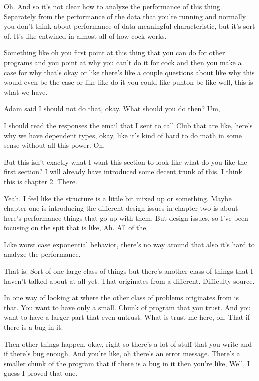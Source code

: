 \begin{subappendices}
    Oh. And so it's not clear how to analyze the performance of this thing. Separately from the performance of the data that you're running and normally you don't think about performance of data meaningful characteristic, but it's sort of. It's like entwined in almost all of how cock works. 
    
    Something like oh you first point at this thing that you can do for other programs and you point at why you can't do it for cock and then you make a case for why that's okay or like there's like a couple questions about like why this would even be the case or like like do it you could like punton be like well, this is what we have. 
    
    Adam said I should not do that, okay. What should you do then? Um, 
    
    I should read the responses the email that I sent to call Club that are like, here's why we have dependent types, okay, like it's kind of hard to do math in some sense without all this power. Oh. 
    
    But this isn't exactly what I want this section to look like what do you like the first section? I will already have introduced some decent trunk of this. I think this is chapter 2. There. 
    
    Yeah. I feel like the structure is a little bit mixed up or something. Maybe chapter one is introducing the different design issues in chapter two is about here's performance things that go up with them. But design issues, so I've been focusing on the spit that is like, Ah. All of the. 
    
    Like worst case exponential behavior, there's no way around that also it's hard to analyze the performance. 
    
    That is. Sort of one large class of things but there's another class of things that I haven't talked about at all yet. That originates from a different. Difficulty source. 
    
    In one way of looking at where the other class of problems originates from is that. You want to have only a small. Chunk of program that you trust. And you want to have a larger part that even untrust. What is trust me here, oh. That if there is a bug in it. 
    
    Then other things happen, okay, right so there's a lot of stuff that you write and if there's bug enough. And you're like, oh there's an error message. There's a smaller chunk of the program that if there is a bug in it then you're like, Well, I guess I proved that one. 
    

\end{subappendices}

